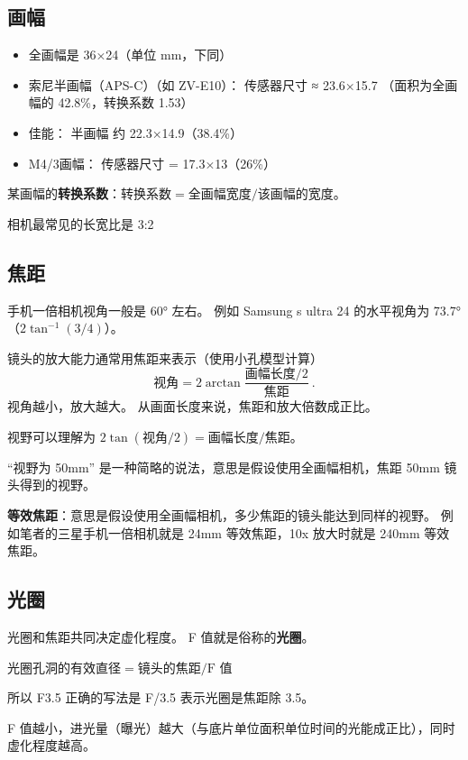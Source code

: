 
\subsection{画幅}
\begin{itemize}
\item 全画幅是 36×24（单位 mm，下同）
\item 索尼半画幅（APS-C）（如 ZV-E10）： 传感器尺寸 ≈ 23.6×15.7 （面积为全画幅的 42.8\%，转换系数 1.53）
\item 佳能： 半画幅 约 22.3×14.9（38.4\%）
\item M4/3画幅： 传感器尺寸 = 17.3×13（26\%）
\end{itemize}

某画幅的\textbf{转换系数}：$\text{转换系数} = \text{全画幅宽度}/\text{该画幅的宽度}$。

相机最常见的长宽比是 3:2

\subsection{焦距}
手机一倍相机视角一般是 60° 左右。 例如 Samsung s ultra 24 的水平视角为 73.7°（$2\tan^{-1}(3/4)$）。

镜头的放大能力通常用焦距来表示（使用小孔模型计算）
\begin{equation}
\text{视角} = 2\arctan{\frac{\text{画幅长度/2}}{\text{焦距}}}~.
\end{equation}
视角越小，放大越大。 从画面长度来说，焦距和放大倍数成正比。

视野可以理解为 $2\tan(\text{视角}/2) = \text{画幅长度}/{\text{焦距}}$。

“视野为 50mm” 是一种简略的说法，意思是假设使用全画幅相机，焦距 50mm 镜头得到的视野。

\textbf{等效焦距}：意思是假设使用全画幅相机，多少焦距的镜头能达到同样的视野。 例如笔者的三星手机一倍相机就是 24mm 等效焦距，10x 放大时就是 240mm 等效焦距。


\subsection{光圈}
光圈和焦距共同决定虚化程度。 F 值就是俗称的\textbf{光圈}。

$\text{光圈孔洞的有效直径} = \text{镜头的焦距}/\text{F 值}$

所以 F3.5 正确的写法是 F/3.5 表示光圈是焦距除 3.5。

F 值越小，进光量（曝光）越大（与底片单位面积单位时间的光能成正比），同时虚化程度越高。

